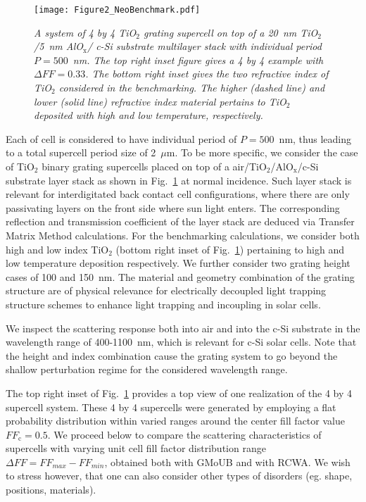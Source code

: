 \documentclass[ floatfix,reprint,amsmath,amssymb,aps,prb]{revtex4-1}
\begin{document}
\begin{figure}[ht]

	\texttt{[image: Figure2\_NeoBenchmark.pdf]}
	\caption{\textit{ A system of 4 by 4 TiO$_2$ grating supercell on top of a 20~nm TiO$_2$/5~nm AlO$_\mathrm{x}$/ c-Si substrate multilayer stack with individual period  $P=500$~nm. The top right inset figure gives a 4 by 4 example with $\Delta FF=0.33$. The bottom right inset gives the two refractive index of TiO$_2$ considered in the benchmarking. The higher (dashed line) and lower (solid line) refractive index material pertains to TiO$_2$ deposited with high and low temperature, respectively. }}\label{fig2}

\end{figure}
Each of cell is considered to have individual period of $P=500$~nm, thus leading to a total supercell period size of 2~$\mu$m. To be more specific, we consider the case of TiO$_2$ binary grating supercells placed on top of a air/TiO$_2$/AlO$_\mathrm{x}$/c-Si substrate layer stack as shown in Fig.~\ref{fig2} at normal incidence. Such layer stack is relevant for interdigitated back contact cell configurations, where there are only passivating layers on the front side where sun light enters\cite{Spinelli2013}. The corresponding reflection and transmission coefficient of the layer stack are deduced via Transfer Matrix Method calculations\cite{Born1980}. For the benchmarking calculations, we consider both high and low index TiO$_2$ (bottom right inset of Fig.~\ref{fig2}) pertaining to high and low temperature deposition respectively. We further consider two grating height cases of 100 and 150~nm. The material and geometry combination of the grating structure are of physical relevance for electrically decoupled light trapping structure schemes to enhance light trapping and incoupling in solar cells\cite{Isabella:16}.  

We inspect the scattering response both into air and into the c-Si substrate in the wavelength range of 400-1100~nm, which is relevant for c-Si solar cells. Note that the height and index combination cause the grating system to go beyond the shallow perturbation regime for the considered wavelength range.
 
The top right inset of Fig.~\ref{fig2} provides a top view of one realization of the 4 by 4 supercell system. These 4 by 4 supercells were generated by employing a flat probability distribution within varied ranges around the center fill factor value $FF_\mathrm{c}=0.5$. We proceed below to compare the scattering characteristics of supercells with varying unit cell fill factor distribution range $\Delta FF=FF_{max}-FF_{min}$, obtained both with GMoUB and with RCWA. We wish to stress however, that one can also consider other types of disorders (eg. shape, positions, materials). 
\end{document}
